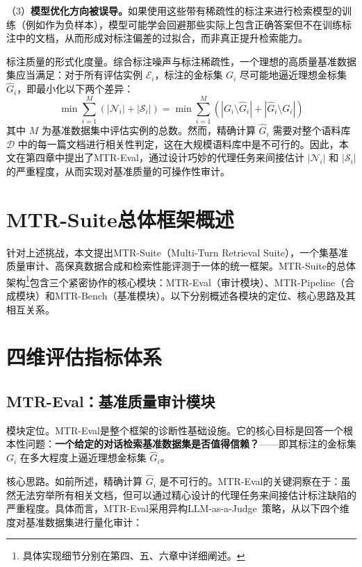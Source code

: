 （3）\textbf{模型优化方向被误导。}如果使用这些带有稀疏性的标注来进行检索模型的训练（例如作为负样本），模型可能学会回避那些实际上包含正确答案但不在训练标注中的文档，从而形成对标注偏差的过拟合，而非真正提升检索能力。


标注质量的形式化度量。综合标注噪声与标注稀疏性，一个理想的高质量基准数据集应当满足：对于所有评估实例 $\mathcal{E}_i$，标注的金标集 $G_i$ 尽可能地逼近理想金标集 $\hat{G}_i$，即最小化以下两个差异：
\begin{equation}
    \min \sum_{i=1}^{M} \left( |\mathcal{N}_i| + |\mathcal{S}_i| \right) = \min \sum_{i=1}^{M} \left( |G_i \setminus \hat{G}_i| + |\hat{G}_i \setminus G_i| \right)
\end{equation}
其中 $M$ 为基准数据集中评估实例的总数。然而，精确计算 $\hat{G}_i$ 需要对整个语料库 $\mathcal{D}$ 中的每一篇文档进行相关性判定，这在大规模语料库中是不可行的。因此，本文在第四章中提出了MTR-Eval，通过设计巧妙的代理任务来间接估计 $|\mathcal{N}_i|$ 和 $|\mathcal{S}_i|$ 的严重程度，从而实现对基准质量的可操作性审计。




\section{MTR-Suite总体框架概述}
\label{sec:framework_overview}

针对上述挑战，本文提出MTR-Suite（Multi-Turn Retrieval Suite），一个集基准质量审计、高保真数据合成和检索性能评测于一体的统一框架。MTR-Suite的总体架构\footnote{具体实现细节分别在第四、五、六章中详细阐述。}包含三个紧密协作的核心模块：MTR-Eval（审计模块）、MTR-Pipeline（合成模块）和MTR-Bench（基准模块）。以下分别概述各模块的定位、核心思路及其相互关系。





\section{四维评估指标体系}

\subsection{MTR-Eval：基准质量审计模块}

模块定位。MTR-Eval是整个框架的诊断性基础设施。它的核心目标是回答一个根本性问题：\textbf{一个给定的对话检索基准数据集是否值得信赖？}——即其标注的金标集 $G_i$ 在多大程度上逼近理想金标集 $\hat{G}_i$。

核心思路。如前所述，精确计算 $\hat{G}_i$ 是不可行的。MTR-Eval的关键洞察在于：虽然无法穷举所有相关文档，但可以通过精心设计的代理任务来间接估计标注缺陷的严重程度。具体而言，MTR-Eval采用异构LLM-as-a-Judge~\citep{zheng2023judging}策略，从以下四个维度对基准数据集进行量化审计：

